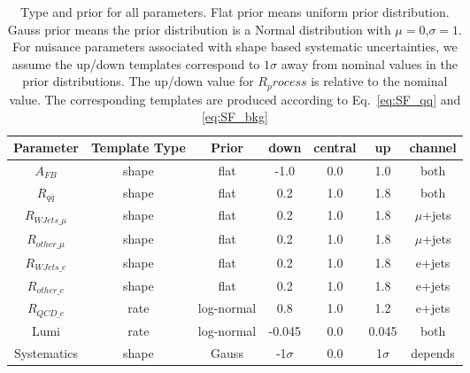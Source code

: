 \begin{table}[htb]
\centering
\begin{tabular}{|c|c c|c c c| c |}
\hline
Parameter     & Template Type & Prior         & down  & central  & up  & channel   \\ \hline
$A_{FB}$      & shape         & flat         & -1.0  & 0.0  & 1.0  & both \\
$R_{q\bar{q}}$ & shape         & flat         & 0.2  & 1.0  & 1.8  & both \\ \hline\hline

$R_{WJets\_\mu}$   & shape         & flat        & 0.2   & 1.0   & 1.8 & $\mu$+jets \\ 
$R_{other\_\mu}$   & shape         & flat         & 0.2   & 1.0  & 1.8 & $\mu$+jets \\
$R_{WJets\_e}$   & shape         & flat        & 0.2   & 1.0   & 1.8 & e+jets \\ 
$R_{other\_e}$   & shape         & flat         & 0.2   & 1.0  & 1.8 & e+jets \\
$R_{QCD\_e}$     & rate         & log-normal         & 0.8   & 1.0  & 1.2 & e+jets \\
Lumi          & rate          & log-normal      & -0.045 & 0.0   & 0.045 & both\\
Systematics   & shape         & Gauss      & -1$\sigma$ & 0.0 & 1$\sigma$  & depends \\ \hline\hline
\end{tabular}
\caption{Type and prior for all parameters. Flat prior means uniform prior distribution. Gauss prior means the prior distribution is a Normal distribution with $\mu=0$,$\sigma=1$. For nuisance parameters associated with shape based systematic uncertainties, we assume the up/down templates correspond to $1 \sigma$ away from nominal values in the prior distributions. The up/down value for $R_process$ is relative to the nominal value. The corresponding templates are produced according to Eq.~\ref{eq:SF_qq} and \ref{eq:SF_bkg} }
\label{table:priors}
\end{table}
